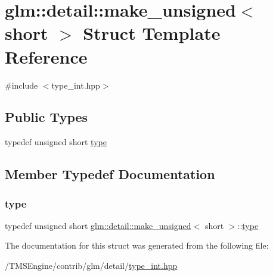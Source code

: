 \hypertarget{structglm_1_1detail_1_1make__unsigned_3_01short_01_4}{}\section{glm\+:\+:detail\+:\+:make\+\_\+unsigned$<$ short $>$ Struct Template Reference}
\label{structglm_1_1detail_1_1make__unsigned_3_01short_01_4}


{\ttfamily \#include $<$type\+\_\+int.\+hpp$>$}

\subsection*{Public Types}
\begin{DoxyCompactItemize}
\item 
typedef unsigned short \hyperlink{structglm_1_1detail_1_1make__unsigned_3_01short_01_4_a58861091aca3a68acc085131cc6fefa4}{type}
\end{DoxyCompactItemize}


\subsection{Member Typedef Documentation}
\mbox{\label{structglm_1_1detail_1_1make__unsigned_3_01short_01_4_a58861091aca3a68acc085131cc6fefa4}} 
\subsubsection{\texorpdfstring{type}{type}}
{\footnotesize\ttfamily typedef unsigned short \hyperlink{structglm_1_1detail_1_1make__unsigned}{glm\+::detail\+::make\+\_\+unsigned}$<$ short $>$\+::\hyperlink{structglm_1_1detail_1_1make__unsigned_3_01short_01_4_a58861091aca3a68acc085131cc6fefa4}{type}}



The documentation for this struct was generated from the following file\+:\begin{DoxyCompactItemize}
\item 
/\+T\+M\+S\+Engine/contrib/glm/detail/\hyperlink{type__int_8hpp}{type\+\_\+int.\+hpp}\end{DoxyCompactItemize}
